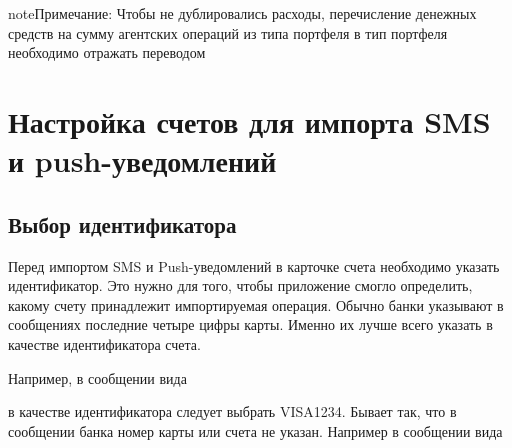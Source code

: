 \documentclass[a4paper,10pt,russian]{sphinxmanual}
\begin{document}
\noindent{}

\begin{sphinxadmonition}{note}{Примечание:}
Чтобы не дублировались расходы, перечисление денежных средств на сумму агентских операций из типа портфеля  в тип портфеля  необходимо отражать переводом
\end{sphinxadmonition}


\chapter{Настройка счетов для импорта SMS и push-уведомлений}
\label{\detokenize{account-identities:sms-push}}\label{\detokenize{account-identities:chapter-account-identities}}\label{\detokenize{account-identities::doc}}

\section{Выбор идентификатора}
\label{\detokenize{account-identities:id1}}
Перед импортом SMS и Push-уведомлений в карточке счета необходимо указать идентификатор. Это нужно для того,
чтобы приложение смогло определить, какому счету принадлежит импортируемая операция. Обычно банки
указывают  в сообщениях последние четыре цифры карты. Именно их лучше всего указать в качестве идентификатора счета.

Например, в сообщении вида

\begin{sphinxVerbatim}[commandchars=\\\{\}]
         
\end{sphinxVerbatim}

в качестве идентификатора следует выбрать VISA1234. Бывает так, что в сообщении банка номер карты или счета не указан.
Например в сообщении вида

\begin{sphinxVerbatim}[commandchars=\\\{\}]
    
\end{sphinxVerbatim}
\end{document}

